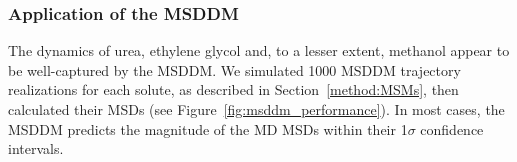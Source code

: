 \documentclass[aps,pre,preprint,groupedaddress,longbibliography]{revtex4-2}
\begin{document}
  \subsubsection{Application of the MSDDM}\label{section:msddm_application}
  
  
  The dynamics of urea, ethylene glycol and, to a lesser extent, methanol appear
  to be well-captured by the MSDDM. We simulated 1000 MSDDM trajectory realizations
  for each solute, as described in Section~\ref{method:MSMs}, then calculated their
  MSDs (see Figure~\ref{fig:msddm_performance}). In most cases, the MSDDM predicts
  the magnitude of the MD MSDs within their 1$\sigma$ confidence intervals. 
  
  
\end{document}
